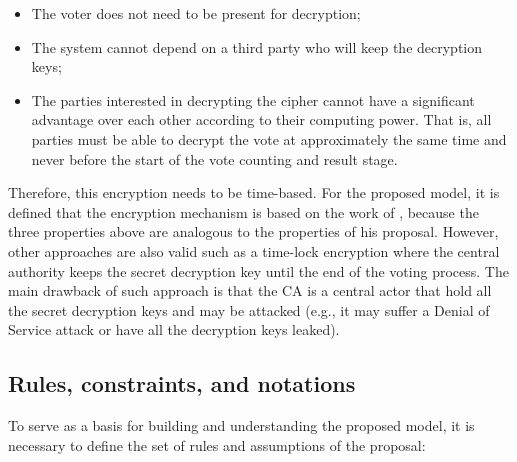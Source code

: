 \documentclass[english]{textolivre}
\begin{document}
\begin{itemize}

\item The voter does not need to be present for decryption;
\item The system cannot depend on a third party who will keep the decryption keys;
\item The parties interested in decrypting the cipher cannot have a significant advantage over each other according to their computing power. That is, all parties must be able to decrypt the vote at approximately the same time and never before the start of the vote counting and result stage.

\end{itemize}

Therefore, this encryption needs to be time-based. For the proposed model, it is defined that the encryption mechanism is based on the work of \textcite{Liu}, because the three properties above are analogous to the properties of his proposal. However, other approaches are also valid such as a time-lock encryption where the central authority keeps the secret decryption key until the end of the voting process. The main drawback of such approach is that the CA is a central actor that hold all the secret decryption keys and may be attacked (e.g., it may suffer a Denial of Service attack or have all the decryption keys leaked). %

\subsection{Rules, constraints, and notations \label{sec-rules}}

To serve as a basis for building and understanding the proposed model, it is necessary to define the set of rules and assumptions of the proposal:
\end{document}
